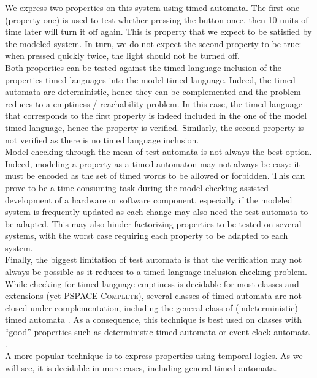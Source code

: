 We express two properties on this system using timed automata. The first one (property one) is used to test whether pressing the button once, then 10 units of time later will turn it off again. This is property that we expect to be satisfied by the modeled system. In turn, we do not expect the second property to be true: when pressed quickly twice, the light should not be turned off.\\

Both properties can be tested against the timed language inclusion of the properties timed languages into the model timed language. Indeed, the timed automata are deterministic, hence they can be complemented and the problem reduces to a emptiness / reachability problem. In this case, the timed language that corresponds to the first property is indeed included in the one of the model timed language, hence the property is verified. Similarly, the second property is not verified as there is no timed language inclusion.\\

Model-checking through the mean of test automata is not always the best option. Indeed, modeling a property as a timed automaton may not always be easy: it must be encoded as the set of timed words to be allowed or forbidden. This can prove to be a time-consuming task during the model-checking assisted development of a hardware or software component, especially if the modeled system is frequently updated as each change may also need the test automata to be adapted. This may also hinder factorizing properties to be tested on several systems, with the worst case requiring each property to be adapted to each system.\\

Finally, the biggest limitation of test automata is that the verification may not always be possible as it reduces to a timed language inclusion checking problem. While checking for timed language emptiness is decidable for most classes and extensions (yet \textsc{PSPACE-Complete}), several classes of timed automata are not closed under complementation, including the general class of (indeterministic) timed automata \cite{RADLD94}. As a consequence, this technique is best used on classes with ``good'' properties such as deterministic timed automata \cite{RADLD94} or event-clock automata \cite{RALF94}.\\

A more popular technique is to express properties using temporal logics. As we will see, it is decidable in more cases, including general timed automata.\\

